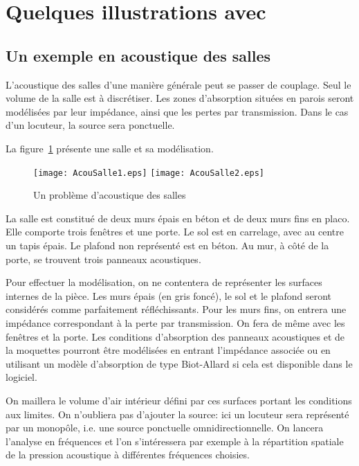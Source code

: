 \medskip
\section{Quelques illustrations avec \freefem}\label{Sec-AcouIllus}

\medskip
\subsection{Un exemple en acoustique des salles}

L'acoustique des salles d'une manière générale peut se passer de couplage. Seul le volume de la salle est à discrétiser. Les zones d'absorption situées en parois seront modélisées par leur impédance, ainsi que les pertes par transmission. Dans le cas d'un locuteur, la source sera ponctuelle.

La figure~\ref{Fig-AcouSalle} présente une salle et sa modélisation.
\begin{figure}[h!]
\centering
\texttt{[image: AcouSalle1.eps]}\hspace{10mm}
\texttt{[image: AcouSalle2.eps]}
\caption{Un problème d'acoustique des salles}\label{Fig-AcouSalle}
\end{figure}
La salle est constitué de deux murs épais en béton et de deux murs fins en placo. Elle comporte trois fenêtres et une porte. Le sol est en carrelage, avec au centre un tapis épais. Le plafond non représenté est en béton. Au mur, à côté de la porte, se trouvent trois panneaux acoustiques.

Pour effectuer la modélisation, on ne contentera de représenter les surfaces internes de la pièce. Les murs épais (en gris foncé), le sol et le plafond seront considérés comme parfaitement réfléchissants. Pour les murs fins, on entrera une impédance correspondant à la perte par transmission. On fera de même avec les fenêtres et la porte. Les conditions d'absorption des panneaux acoustiques et de la moquettes pourront être modélisées en entrant l'impédance associée ou en utilisant un modèle d'absorption de type Biot-Allard si cela est disponible dans le logiciel.

On maillera le volume d'air intérieur défini par ces surfaces portant les conditions aux limites. On n'oubliera pas d'ajouter la source: ici un locuteur sera représenté par un monopôle, i.e. une source ponctuelle omnidirectionnelle. On lancera l'analyse en fréquences et l'on s'intéressera par exemple à la répartition spatiale de la pression acoustique à différentes fréquences choisies.


